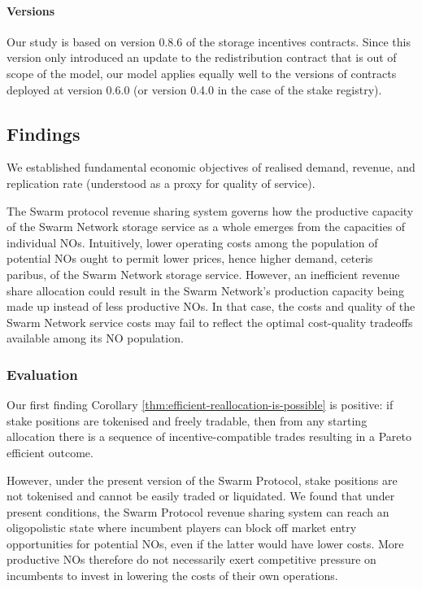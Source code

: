 \paragraph{Versions}
Our study is based on version 0.8.6 of the storage incentives contracts.
%
Since this version only introduced an update to the redistribution contract that is out of scope of the model, our model applies equally well to the versions of contracts deployed at version 0.6.0 (or version 0.4.0 in the case of the stake registry).



\subsection{Findings}

We established fundamental economic objectives of realised demand, revenue, and replication rate (understood as a proxy for quality of service). 

The Swarm protocol revenue sharing system governs how the productive capacity of the Swarm Network storage service as a whole emerges from the capacities of individual NOs.
%
Intuitively, lower operating costs among the population of potential NOs ought to permit lower prices, hence higher demand, ceteris paribus, of the Swarm Network storage service.
%
However, an inefficient revenue share allocation could result in the Swarm Network's production capacity being made up instead of less productive NOs.
%
In that case, the costs and quality of the Swarm Network service costs may fail to reflect the optimal cost-quality tradeoffs available among its NO population.






\subsubsection{Evaluation}
%
Our first finding Corollary \ref{thm:efficient-reallocation-is-possible} is positive: if stake positions are tokenised and freely tradable, then from any starting allocation there is a sequence of incentive-compatible trades resulting in a Pareto efficient outcome.

However, under the present version of the Swarm Protocol, stake positions are not tokenised and cannot be easily traded or liquidated.
%
We found that under present conditions, the Swarm Protocol revenue sharing system can reach an oligopolistic state where incumbent players can block off market entry opportunities for potential NOs, even if the latter would have lower costs.
%
More productive NOs therefore do not necessarily exert competitive pressure on incumbents to invest in lowering the costs of their own operations.


